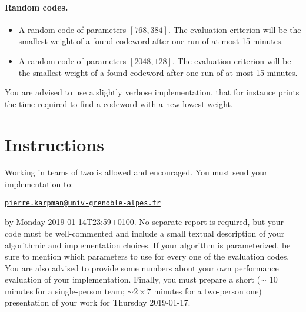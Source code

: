 \documentclass[11pt,a4paper]{article}
\theoremstyle{definition}
\begin{document}
\paragraph{Random codes.}
\begin{itemize}
	\item A random code of parameters $[768, 384]$. The evaluation criterion will be the smallest weight of a found codeword after one run of at most 15 minutes.
	\item A random code of parameters $[2048, 128]$. The evaluation criterion will be the smallest weight of a found codeword after one run of at most 15 minutes.
\end{itemize}

You are advised to use a slightly verbose implementation, that for instance prints the time required to find a codeword with a new lowest weight.

\section{Instructions}
Working in teams of two is allowed and encouraged. You must send your implementation to:
\begin{center}
\href{mailto:pierre.karpman@univ-grenoble-alpes.fr}{\texttt{pierre.karpman@univ-grenoble-alpes.fr}}
\end{center}
by Monday 2019-01-14T23:59+0100. No separate report is required, but your code must be well-commented and include a small textual description of your algorithmic and implementation choices.
If your algorithm is parameterized, be sure to mention which parameters to use for every one of the evaluation codes. You are also advised to provide some numbers about your own
performance evaluation of your implementation.
Finally, you must prepare a short ($\sim$ 10 minutes for a single-person team; $\sim 2\times7$ minutes for a two-person one) presentation of your
work for Thursday 2019-01-17.

\nocite{*}



\end{document}
